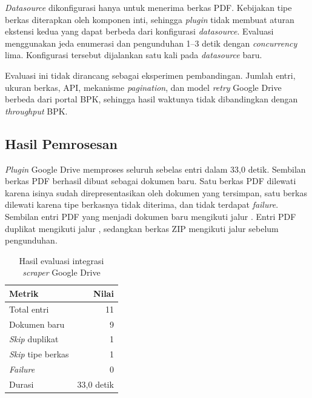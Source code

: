 \textit{Datasource} dikonfigurasi hanya untuk menerima berkas PDF.
Kebijakan tipe berkas diterapkan oleh komponen inti, sehingga \textit{plugin} tidak membuat aturan ekstensi kedua yang dapat berbeda dari konfigurasi \textit{datasource}.
Evaluasi menggunakan jeda enumerasi dan pengunduhan 1--3 detik dengan \textit{concurrency} lima.
Konfigurasi tersebut dijalankan satu kali pada \textit{datasource} baru.

Evaluasi ini tidak dirancang sebagai eksperimen pembandingan.
Jumlah entri, ukuran berkas, API, mekanisme \textit{pagination}, dan model \textit{retry} Google Drive berbeda dari portal BPK, sehingga hasil waktunya tidak dibandingkan dengan \textit{throughput} BPK.

\subsection{Hasil Pemrosesan}
\label{sec:hasil-evaluasi-google-drive}

\textit{Plugin} Google Drive memproses seluruh sebelas entri dalam 33,0 detik.
Sembilan berkas PDF berhasil dibuat sebagai dokumen baru.
Satu berkas PDF dilewati karena isinya sudah direpresentasikan oleh dokumen yang tersimpan, satu berkas  dilewati karena tipe berkasnya tidak diterima, dan tidak terdapat \textit{failure}.
Sembilan entri PDF yang menjadi dokumen baru mengikuti jalur .
Entri PDF duplikat mengikuti jalur , sedangkan berkas ZIP mengikuti jalur  sebelum pengunduhan.

\begin{table}[htb]
  \centering
  \footnotesize
  \caption{Hasil evaluasi integrasi \textit{scraper} Google Drive}
  \label{tab:hasil-evaluasi-google-drive}
  \begin{tabular}{@{}lr@{}}
    \toprule
    \textbf{Metrik} & \textbf{Nilai} \\
    \midrule
    Total entri & 11 \\
    Dokumen baru & 9 \\
    \textit{Skip} duplikat & 1 \\
    \textit{Skip} tipe berkas & 1 \\
    \textit{Failure} & 0 \\
    Durasi & 33,0 detik \\
    \bottomrule
  \end{tabular}
\end{table}

